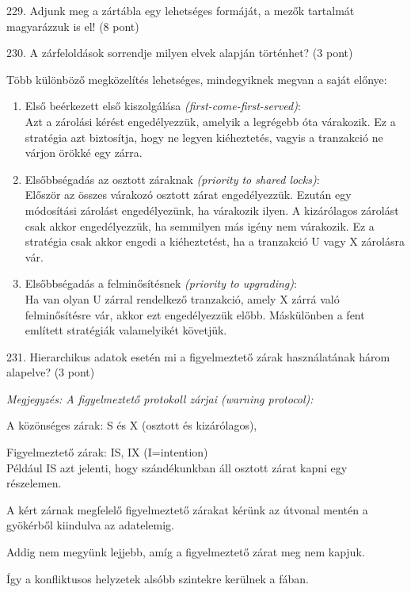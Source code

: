 \documentclass[a4paper,11.5pt, table]{article}
\begin{document}
229. Adjunk meg a zártábla egy lehetséges formáját, a mezők tartalmát magyarázzuk is el! (8 pont)

230. A zárfeloldások sorrendje milyen elvek alapján történhet? (3 pont)
	\begin{compactitem}
		\item Több különböző megközelítés lehetséges, mindegyiknek megvan a saját előnye:
		\begin{enumerate}
			\item Első beérkezett első kiszolgálása \textit{(first-come-first-served)}: \\
			Azt a zárolási kérést engedélyezzük, amelyik a legrégebb óta várakozik. Ez a stratégia azt biztosítja, hogy ne legyen kiéheztetés, vagyis a tranzakció ne várjon örökké egy zárra.
			\item Elsőbbségadás az osztott záraknak \textit{(priority to shared locks)}:\\
			 Először az összes várakozó osztott zárat engedélyezzük. Ezután egy módosítási zárolást engedélyezünk, ha várakozik ilyen. A kizárólagos zárolást csak akkor engedélyezzük, ha semmilyen más igény nem várakozik. Ez a stratégia csak akkor engedi a kiéheztetést, ha a tranzakció U vagy X zárolásra vár.
			\item Elsőbbségadás a felminősítésnek \textit{(priority to upgrading)}:\\
			 Ha van olyan U zárral rendelkező tranzakció, amely X zárrá való felminősítésre vár, akkor ezt engedélyezzük előbb. Máskülönben a fent említett stratégiák valamelyikét követjük.
		\end{enumerate}
	\end{compactitem}
		
231. Hierarchikus adatok esetén mi a figyelmeztető zárak használatának három alapelve? (3 pont)
	\begin{compactitem}
		\item \textit{Megjegyzés: A figyelmeztető protokoll  zárjai (warning protocol):}
		\begin{compactitem}
			\item A közönséges zárak: S és X (osztott és kizárólagos), 
			\item Figyelmeztető zárak: IS, IX (I=intention)\\
			Például IS azt jelenti, hogy szándékunkban áll osztott zárat kapni egy részelemen. 
		\end{compactitem}
		\item A kért zárnak megfelelő figyelmeztető zárakat kérünk az útvonal mentén a gyökérből kiindulva az adatelemig. 
		\item Addig nem megyünk lejjebb, amíg a figyelmeztető zárat meg nem kapjuk.
		\item Így a konfliktusos helyzetek alsóbb szintekre kerülnek a fában.		
	\end{compactitem}
\end{document}
